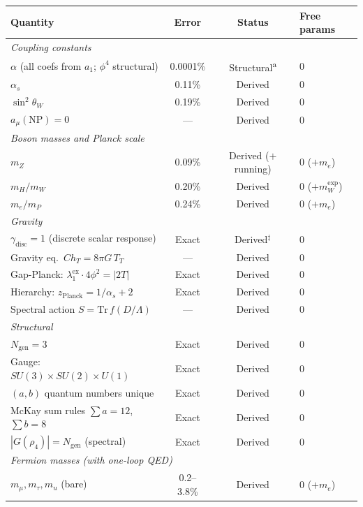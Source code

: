 \documentclass[12pt,a4paper]{article}
\theoremstyle{definition}
\begin{document}
\begin{table}[H]
\centering\footnotesize
\captionsetup{width=\textwidth,singlelinecheck=off}
\begin{tabular}{lccl}
\toprule
\textbf{Quantity} & \textbf{Error} & \textbf{Status} & \textbf{Free params} \\
\midrule
\multicolumn{4}{l}{\textit{Coupling constants}} \\
$\alpha$ (all coefs from $a_1$; $\phi^4$ structural) & 0.0001\% & Structural\textsuperscript{a} & 0 \\
$\alpha_s$ & 0.11\% & Derived & 0 \\
$\sin^2\theta_W$ & 0.19\% & Derived & 0 \\
$a_\mu(\text{NP}) = 0$ & --- & Derived & 0 \\
\midrule
\multicolumn{4}{l}{\textit{Boson masses and Planck scale}} \\
$m_Z$ & 0.09\% & Derived ($+$running) & 0 ($+m_e$) \\
$m_H/m_W$ & 0.20\% & Derived & 0 ($+m_W^{\text{exp}}$) \\
$m_e/m_P$ & 0.24\% & Derived & 0 ($+m_e$) \\
\midrule
\multicolumn{4}{l}{\textit{Gravity}} \\
$\gamma_{\text{disc}} = 1$ (discrete scalar response) & Exact & Derived$^\ddagger$ & 0 \\
Gravity eq.\ $C h_T = 8\pi G\, T_T$ & --- & Derived & 0 \\
Gap-Planck: $\lambda_1^{\text{ex}} \cdot 4\phi^2 = |2T|$ & Exact & Derived & 0 \\
Hierarchy: $z_{\text{Planck}} = 1/\alpha_s + 2$ & Exact & Derived & 0 \\
Spectral action $S = \mathrm{Tr}\,f(D/\Lambda)$ & --- & Derived & 0 \\
\midrule
\multicolumn{4}{l}{\textit{Structural}} \\
$N_{\text{gen}} = 3$ & Exact & Derived & 0 \\
Gauge: $SU(3) \times SU(2) \times U(1)$ & Exact & Derived & 0 \\
$(a,b)$ quantum numbers unique & Exact & Derived & 0 \\
McKay sum rules $\sum a = 12$, $\sum b = 8$ & Exact & Derived & 0 \\
$|G(\rho_4)| = N_{\text{gen}}$ (spectral) & Exact & Derived & 0 \\
\midrule
\multicolumn{4}{l}{\textit{Fermion masses (with one-loop QED)}} \\
$m_\mu, m_\tau, m_u$ (bare) & 0.2--3.8\% & Derived & 0 ($+m_e$) \\

\end{tabular}
\end{table}
\end{document}
